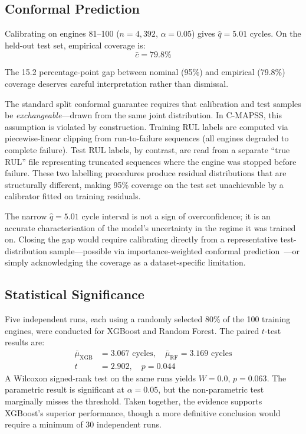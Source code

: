 \documentclass[10pt, journal, letterpaper]{IEEEtran}
\begin{document}
\subsection{Conformal Prediction}

Calibrating on engines 81--100 ($n = 4{,}392$, $\alpha = 0.05$) gives
$\hat{q} = 5.01$ cycles. On the held-out test set, empirical coverage is:
\begin{equation}
  \hat{c} = 79.8\%
\end{equation}

The 15.2 percentage-point gap between nominal (95\%) and empirical (79.8\%)
coverage deserves careful interpretation rather than dismissal.

The standard split conformal guarantee requires that calibration and test
samples be \emph{exchangeable}—drawn from the same joint distribution. In
C-MAPSS, this assumption is violated by construction. Training RUL labels are
computed via piecewise-linear clipping from run-to-failure sequences (all
engines degraded to complete failure). Test RUL labels, by contrast, are read
from a separate ``true RUL'' file representing truncated sequences where the
engine was stopped before failure. These two labelling procedures produce
residual distributions that are structurally different, making 95\% coverage
on the test set unachievable by a calibrator fitted on training residuals.

The narrow $\hat{q} = 5.01$ cycle interval is not a sign of overconfidence;
it is an accurate characterisation of the model's uncertainty in the regime
it was trained on. Closing the gap would require calibrating directly from a
representative test-distribution sample—possible via importance-weighted
conformal prediction~\cite{angelopoulos2021}—or simply acknowledging the
coverage as a dataset-specific limitation.

\subsection{Statistical Significance}

Five independent runs, each using a randomly selected 80\% of the 100
training engines, were conducted for XGBoost and Random Forest. The paired
$t$-test results are:
\begin{align}
  \bar\mu_\mathrm{XGB} &= 3.067\text{ cycles},\quad
  \bar\mu_\mathrm{RF}  = 3.169\text{ cycles}\\
  t &= 2.902,\quad p = 0.044
\end{align}
A Wilcoxon signed-rank test on the same runs yields $W = 0.0$, $p = 0.063$.
The parametric result is significant at $\alpha = 0.05$, but the non-parametric
test marginally misses the threshold. Taken together, the evidence supports
XGBoost's superior performance, though a more definitive conclusion would
require a minimum of 30 independent runs.
\end{document}
